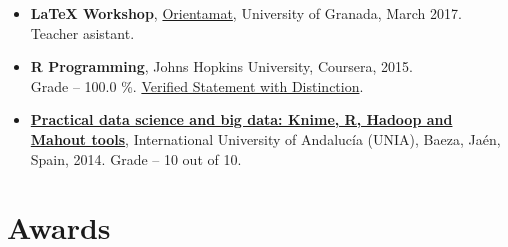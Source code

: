 \documentclass[10pt,a4paper,sans]{moderncv} %
\begin{document}
\begin{itemize}
\item \textbf{LaTeX Workshop}, \textcolor{color1}{\href{http://www.ugr.es/~orientamat/edicion4.html}{Orientamat}}, University of Granada, March 2017. Teacher asistant.
\item \textbf{R Programming}, Johns Hopkins University, Coursera, 2015. \\ Grade -- 100.0 \%. \textcolor{colorl}{\href{https://www.coursera.org/account/accomplishments/records/AHz97RsSWEVHpqkY}{Verified Statement with Distinction}}.
 
\item \href{http://blogs.unia.es/uniatv/archives/2571}{\textbf{Practical data science and big data: Knime, R, Hadoop and Mahout tools}}, International University of Andalucía (UNIA), Baeza, Ja\'en, Spain, 2014. Grade -- 10 out of 10.
\end{itemize}







\vspace*{-2mm}
\section{Awards}
\end{document}
